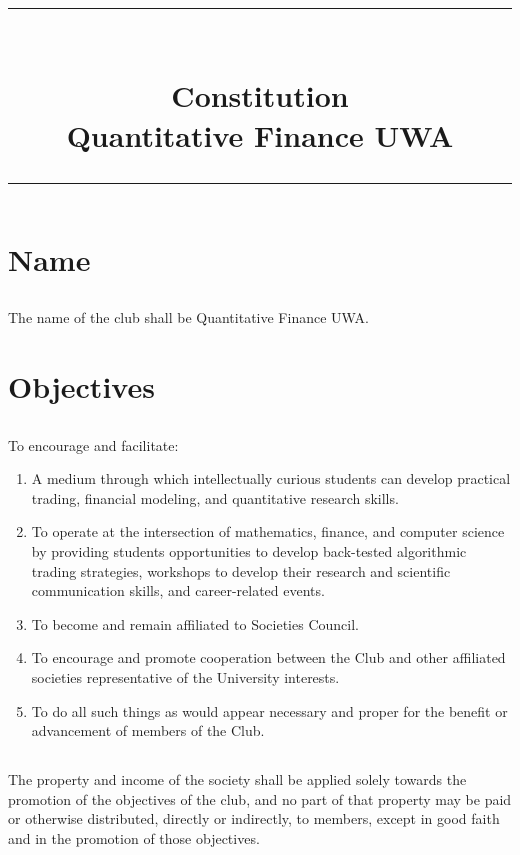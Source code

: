 \documentclass[10.5pt]{article}
\title{\rule{\linewidth}{0.4pt}\\[0.4cm]
        Constitution \\[0.4cm]
        Quantitative Finance UWA \\[0.4cm]
        \rule{\linewidth}{0.4pt}}
\date{}
\begin{document}
\maketitle


\section{Name}
\subsection{}
The name of the club shall be Quantitative Finance UWA.


\section{Objectives}
\subsection{}
To encourage and facilitate:
\begin{enumerate}[label=(\alph*)]
    \item A medium through which intellectually curious students can develop practical trading, financial modeling, and quantitative research skills.
    \item To operate at the intersection of mathematics, finance, and computer science by providing students opportunities to develop back-tested algorithmic trading strategies, workshops to develop their research and scientific communication skills, and career-related events.
    \item To become and remain affiliated to Societies Council.
    \item To encourage and promote cooperation between the Club and other affiliated societies representative of the University interests.
    \item To do all such things as would appear necessary and proper for the benefit or advancement of members of the Club.
\end{enumerate}

\subsection{}
The property and income of the society shall be applied solely towards the promotion of the objectives of the club, and no part of that property may be paid or otherwise distributed, directly or indirectly, to members, except in good faith and in the promotion of those objectives.
\end{document}
